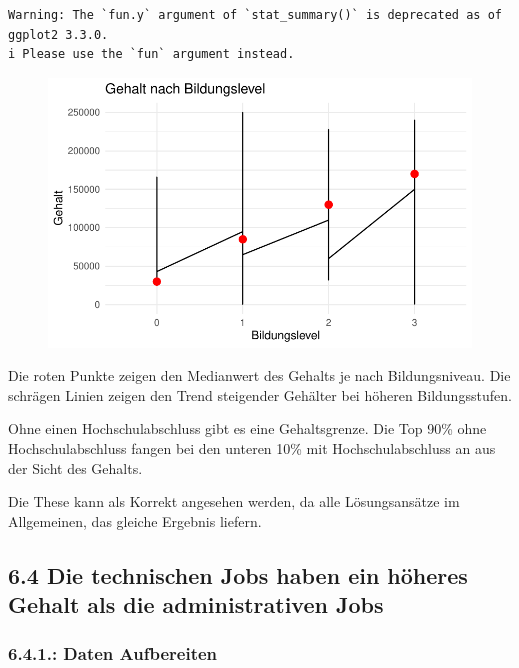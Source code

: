 \documentclass[
  letterpaper,
  DIV=11,
  numbers=noendperiod]{scrartcl}
\begin{document}
\begin{verbatim}
Warning: The `fun.y` argument of `stat_summary()` is deprecated as of ggplot2 3.3.0.
i Please use the `fun` argument instead.
\end{verbatim}

\begin{figure}[H]

{\centering \includegraphics{main_doc_files/figure-pdf/unnamed-chunk-80-1.pdf}

}

\end{figure}

Die roten Punkte zeigen den Medianwert des Gehalts je nach
Bildungsniveau. Die schrägen Linien zeigen den Trend steigender Gehälter
bei höheren Bildungsstufen.

Ohne einen Hochschulabschluss gibt es eine Gehaltsgrenze. Die Top 90\%
ohne Hochschulabschluss fangen bei den unteren 10\% mit
Hochschulabschluss an aus der Sicht des Gehalts.

Die These kann als Korrekt angesehen werden, da alle Lösungsansätze im
Allgemeinen, das gleiche Ergebnis liefern.

\hypertarget{die-technischen-jobs-haben-ein-huxf6heres-gehalt-als-die-administrativen-jobs}{%
\subsection{6.4 Die technischen Jobs haben ein höheres Gehalt als die
administrativen
Jobs}\label{die-technischen-jobs-haben-ein-huxf6heres-gehalt-als-die-administrativen-jobs}}

\hypertarget{daten-aufbereiten-1}{%
\subsubsection{6.4.1.: Daten Aufbereiten}\label{daten-aufbereiten-1}}
\end{document}
